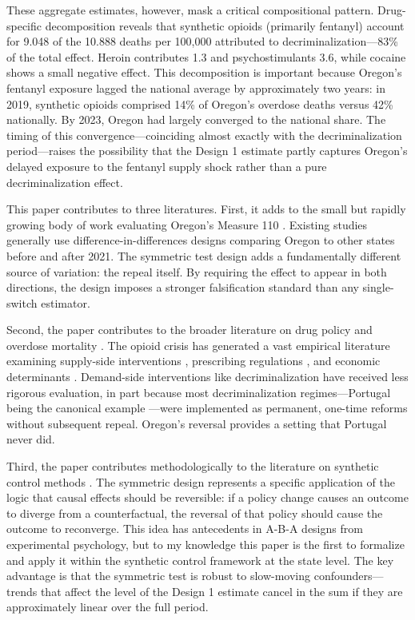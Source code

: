 \documentclass[12pt]{article}
\begin{document}
These aggregate estimates, however, mask a critical compositional pattern. Drug-specific decomposition reveals that synthetic opioids (primarily fentanyl) account for 9.048 of the 10.888 deaths per 100,000 attributed to decriminalization---83\% of the total effect. Heroin contributes 1.3 and psychostimulants 3.6, while cocaine shows a small negative effect. This decomposition is important because Oregon's fentanyl exposure lagged the national average by approximately two years: in 2019, synthetic opioids comprised 14\% of Oregon's overdose deaths versus 42\% nationally. By 2023, Oregon had largely converged to the national share. The timing of this convergence---coinciding almost exactly with the decriminalization period---raises the possibility that the Design 1 estimate partly captures Oregon's delayed exposure to the fentanyl supply shock rather than a pure decriminalization effect.

This paper contributes to three literatures. First, it adds to the small but rapidly growing body of work evaluating Oregon's Measure 110 \citep{dave2023effects, doleac2023policy, mcginty2023decriminalization}. Existing studies generally use difference-in-differences designs comparing Oregon to other states before and after 2021. The symmetric test design adds a fundamentally different source of variation: the repeal itself. By requiring the effect to appear in both directions, the design imposes a stronger falsification standard than any single-switch estimator.

Second, the paper contributes to the broader literature on drug policy and overdose mortality \citep{maclean2022economic, schnell2024opioid}. The opioid crisis has generated a vast empirical literature examining supply-side interventions \citep{alpert2018supply}, prescribing regulations \citep{currie2019opioid}, and economic determinants \citep{hollingsworth2017opioids, ruhm2019drivers}. Demand-side interventions like decriminalization have received less rigorous evaluation, in part because most decriminalization regimes---Portugal being the canonical example \citep{hughes2010portuguese}---were implemented as permanent, one-time reforms without subsequent repeal. Oregon's reversal provides a setting that Portugal never did.

Third, the paper contributes methodologically to the literature on synthetic control methods \citep{abadie2021penalized, ferman2021synthetic}. The symmetric design represents a specific application of the logic that causal effects should be reversible: if a policy change causes an outcome to diverge from a counterfactual, the reversal of that policy should cause the outcome to reconverge. This idea has antecedents in A-B-A designs from experimental psychology, but to my knowledge this paper is the first to formalize and apply it within the synthetic control framework at the state level. The key advantage is that the symmetric test is robust to slow-moving confounders---trends that affect the level of the Design 1 estimate cancel in the sum if they are approximately linear over the full period.
\end{document}
